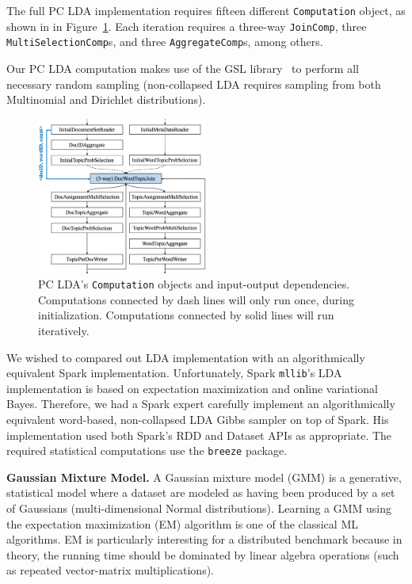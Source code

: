 The full PC LDA implementation requires fifteen different \texttt{Computation} object, as shown in 
in Figure~\ref{fig:lda-query-graph}.  Each iteration requires a 
three-way \texttt{JoinComp}, three \texttt{MultiSelectionComp}s, and three
\texttt{AggregateComp}s, among others. 

Our PC LDA computation makes use of the GSL library~\cite{gsl} to perform all necessary random sampling (non-collapsed LDA requires 
sampling from both Multinomial and Dirichlet distributions).

\begin{figure}
\centering
\includegraphics[width=0.5\textwidth]{lda-query-graph.pdf}
  \caption{\label{fig:lda-query-graph} PC LDA's \texttt{Computation} objects and input-output dependencies. Computations
    connected by dash lines will only run once, during  
    initialization. Computations connected by solid lines will run iteratively.}
\end{figure}

We wished to compared out LDA implementation with an algorithmically equivalent Spark implementation.  Unfortunately,
Spark \texttt{mllib}'s LDA implementation is based on expectation
maximization and online variational Bayes.
Therefore, we had a Spark expert 
carefully implement an algorithmically
equivalent word-based, non-collapsed LDA Gibbs sampler on top of Spark.  His implementation used both
Spark's RDD and Dataset        
APIs as appropriate.
The required statistical computations use the
\texttt{breeze} package. 


\vspace{5pt}
\noindent
\textbf{Gaussian Mixture Model.} A Gaussian mixture model (GMM) is a generative, statistical model where a dataset are modeled
as having been produced by a set of Gaussians (multi-dimensional Normal distributions). Learning a GMM using
the expectation maximization (EM) algorithm is one of the classical ML algorithms.
EM is particularly interesting for a distributed benchmark because in theory, the running time should be dominated
by linear algebra operations (such as repeated vector-matrix multiplications).

